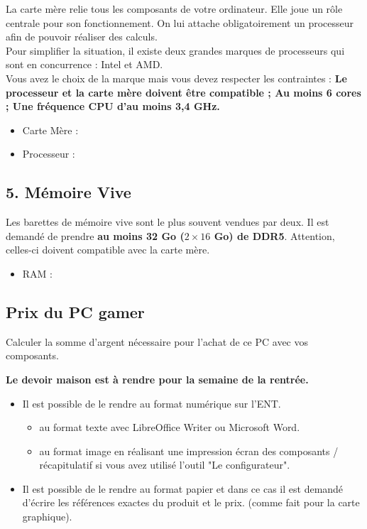 La carte mère relie tous les composants de votre ordinateur. Elle joue un rôle centrale pour son fonctionnement. On lui attache obligatoirement un processeur afin de pouvoir réaliser des calculs.\\

Pour simplifier la situation, il existe deux grandes marques de processeurs qui sont en concurrence : Intel et AMD. \\

Vous avez le choix de la marque mais vous devez respecter les contraintes : \textbf{Le processeur et la carte mère doivent être compatible ; Au moins 6 cores ; Une fréquence CPU d'au moins 3,4 GHz.}

\begin{itemize}[label={$\bullet$}]
  \item Carte Mère :  \dotfill
  \item Processeur :  \dotfill
\end{itemize} 


\subsection*{5. Mémoire Vive} 

Les barettes de mémoire vive sont le plus souvent vendues par deux. Il est demandé de prendre \textbf{au moins 32 Go ($2 \times 16$ Go) de DDR5}. Attention, celles-ci doivent compatible avec la carte mère. 

\begin{itemize}[label={$\bullet$}]
  \item RAM :  \dotfill
\end{itemize} 


\subsection*{Prix du PC gamer} 

Calculer la somme d'argent nécessaire pour l'achat de ce PC avec vos composants.

\Pointilles[2]

\horrule{2px}

\begin{center}
  \textbf{Le devoir maison est à rendre pour la semaine de la rentrée.}
\end{center}

\begin{itemize}
  \item Il est possible de le rendre au format numérique sur l'ENT. 
  \begin{itemize}[label={$\bullet$}]
    \item au format texte avec LibreOffice Writer ou Microsoft Word.  
    \item au format image en réalisant une impression écran des composants / récapitulatif si vous avez utilisé l'outil "Le configurateur".
  \end{itemize}
  \item Il est possible de le rendre au format papier et dans ce cas il est demandé d'écrire les références exactes du produit et le prix. (comme fait pour la carte graphique). 
\end{itemize} 

